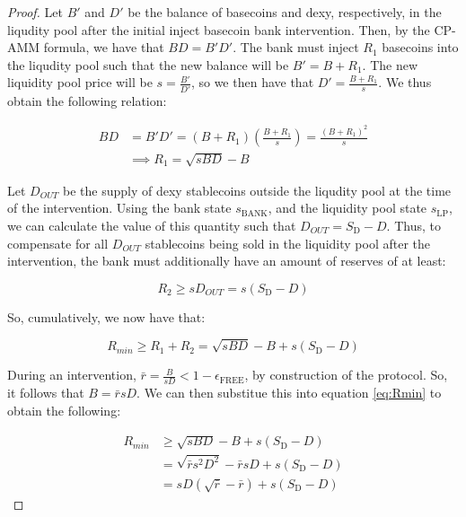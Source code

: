 \documentclass{ifcolog}
\newcommand{\Sd}{S_{\mathrm{D}}}
\newcommand{\rr}{\bar{r}}
\newcommand{\sbank}{s_{\textrm{BANK}}}
\newcommand{\slp}{s_{\mathrm{LP}}}
\newcommand{\epsilonfree}{\epsilon_{\textrm{FREE}}}
\begin{document}
\begin{proof}
  Let $B'$ and $D'$ be the balance of basecoins and dexy, respectively, in the liqudity pool after the initial 
  inject basecoin bank intervention. Then, by the CP-AMM formula, we have that $BD = B'D'$. The bank must inject $R_1$ basecoins
  into the liqudity pool such that the new balance will be $B' = B + R_1$. The new liquidity pool price will be $s = \frac{B'}{D'}$, 
  so we then have that $D' = \frac{B + R_1}{s}$. We thus obtain the following relation:
  
  \begin{align}
    BD &= B'D' = (B+R_1)\left(\frac{B+R_1}{s}\right) = \frac{(B+R_1)^2}{s} \\
       &\implies R_1 = \sqrt{sBD} - B
  \end{align}

  Let $D_{OUT}$ be the supply of dexy stablecoins outside the liqudity pool at the time of the intervention.
  Using the bank state $\sbank$, and the liquidity pool state $\slp$, we can calculate the value of this 
  quantity such that $D_{OUT} = \Sd - D$. Thus, to compensate for all $D_{OUT}$ stablecoins being sold
  in the liquidity pool after the intervention, the bank must additionally have an amount of reserves of at least:

  \begin{equation}
    R_2 \ge s D_{OUT} = s(\Sd - D)
  \end{equation}

  So, cumulatively, we now have that: 

  \begin{equation}
    \label{eq:Rmin}
    R_{min} \ge R_1 + R_2 = \sqrt{sBD} - B + s\left(\Sd - D\right)
  \end{equation}

  During an intervention, $\rr = \frac{B}{sD} < 1 - \epsilonfree$, by construction of the protocol.
  So, it follows that $B = \rr sD$. We can then substitue this into equation \ref{eq:Rmin} to obtain the following:

  \begin{align}
    R_{min} &\ge \sqrt{sBD} - B + s\left(\Sd - D\right) \\
            &= \sqrt{\rr s^2 D^2} - \rr sD + s\left(\Sd - D\right) \\
            &= sD \left( \sqrt{\rr} - \rr \right) + s\left(\Sd - D\right)
  \end{align}

\end{proof}
\end{document}

